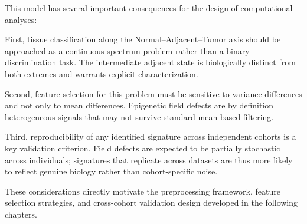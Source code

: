 This model has several important consequences for the design of computational
analyses:

First, tissue classification along the Normal–Adjacent–Tumor axis should be
approached as a continuous-spectrum problem rather than a binary discrimination
task. The intermediate adjacent state is biologically distinct from both extremes
and warrants explicit characterization.

Second, feature selection for this problem must be sensitive to variance differences
and not only to mean differences. Epigenetic field defects are by definition
heterogeneous signals that may not survive standard mean-based filtering.

Third, reproducibility of any identified signature across independent cohorts is
a key validation criterion. Field defects are expected to be partially stochastic
across individuals; signatures that replicate across datasets are thus more likely
to reflect genuine biology rather than cohort-specific noise.

These considerations directly motivate the preprocessing framework, feature
selection strategies, and cross-cohort validation design developed in the
following chapters.
